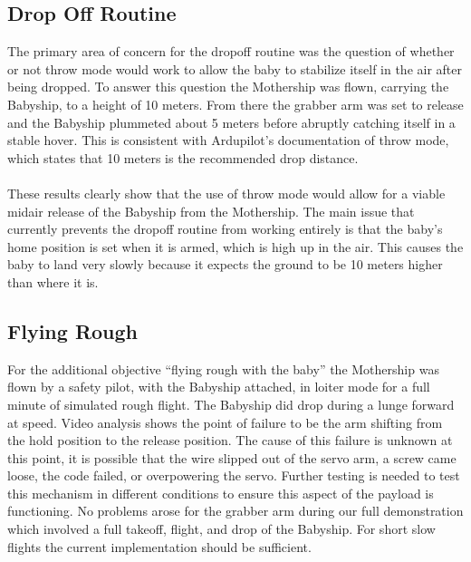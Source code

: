 \documentclass[11pt]{article}
\begin{document}
\subsection{Drop Off Routine}
The primary area of concern for the dropoff routine was the question of whether or not throw mode would work to allow the baby to stabilize itself in the air after being dropped. To answer this question the Mothership was flown, carrying the Babyship,  to a height of 10 meters. From there the grabber arm was set to release and the Babyship plummeted about 5 meters before abruptly catching itself in a stable hover. This is consistent with Ardupilot’s documentation of throw mode, which states that 10 meters is the recommended drop distance.\\\\
These results clearly show that the use of throw mode would allow for a viable midair release of the Babyship from the Mothership. The main issue that currently prevents the dropoff routine from working entirely is that the baby’s home position is set when it is armed, which is high up in the air. This causes the baby to land very slowly because it expects the ground to be 10 meters higher than where it is.
\subsection{Flying Rough}
For the additional objective “flying rough with the baby” the Mothership was flown by a safety pilot, with the Babyship attached, in loiter mode for a full minute of simulated rough flight. The Babyship did drop during a lunge forward at speed. Video analysis shows the point of failure to be the arm shifting from the hold position to the release position. The cause of this failure is unknown at this point, it is possible that the wire slipped out of the servo arm, a screw came loose, the code failed, or overpowering the servo. Further testing is needed to test this mechanism in different conditions to ensure this aspect of the payload is functioning. No problems arose for the grabber arm during our full demonstration which involved a full takeoff, flight, and drop of the Babyship. For short slow flights the current implementation should be sufficient.
\end{document}
